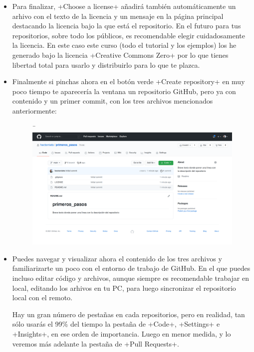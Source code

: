 \documentclass[a5paper,10pt]{article}
\begin{document}
\begin{itemize}
        \item Para finalizar, \cverb+Choose a license+  añadirá   también automáticamente un arhivo con el texto de la licencia y un mensaje en la página principal destacando la licencia bajo la que está el repositorio. En el futuro para tus repositorios, sobre todo los públicos, es recomendable elegir cuidadosamente la licencia. En este caso este curso (todo el tutorial y los ejemplos) los he generado bajo la licencia \cverb+Creative Commons Zero+ por lo que tienes libertad total para usarlo y distribuirlo para lo que te plazca.
       
        \item Finalmente si pinchas ahora en el botón verde \cverb+Create repository+ en muy poco tiempo te aparecería la ventana un repositorio GitHub, pero ya con contenido y un primer commit, con los tres archivos mencionados anteriormente:
       
       \begin{figure}[H]¯
        \hspace{-1cm}\includegraphics[width=1.2\columnwidth]{github_new_repo}
       \end{figure}
       
        \item Puedes navegar y visualizar ahora el contenido de los tres archivos y familiarizarte un poco con el entorno de trabajo de GitHub. En el que puedes incluso editar código y archivos, aunque siempre es recomendable trabajar en local, editando los arhivos en tu PC, para luego sincronizar el repositorio local con el remoto. 
        
        Hay un gran número de pestañas en cada repositorios, pero en realidad, tan sólo usarás el 99\% del tiempo la pestaña de \cverb+Code+, \cverb+Settings+ e \cverb+Insights+, en ese orden de importancia. Luego en menor medida, y lo veremos más adelante la pestaña de \cverb+Pull Requests+.
       \end{itemize}
       
\end{document}
